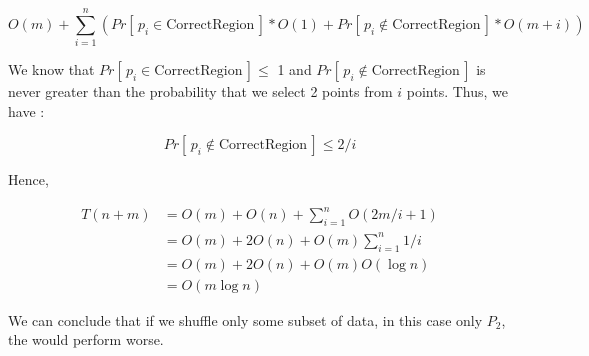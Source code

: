 $$
O(m) + \sum_{i=1}^{n}{ ( Pr[\,p_i \in \text{CorrectRegion}\,]*O(1) 
    + Pr[\,p_i \not\in \text{CorrectRegion}\,]*O(m+i)
) }
$$

We know that $Pr[\,p_i \in \text{CorrectRegion}\,] \le$ 1 and $Pr[\,p_i \not\in \text{CorrectRegion}\,]$
is never greater than the probability that we select 2 points from $i$ points. Thus,
we have :

$$
Pr[\,p_i \not\in \text{CorrectRegion}\,] \le 2/i
$$

Hence,

\begin{align*}
T(n+m) &= O(m) + O(n) + \sum_{i=1}^{n}O(2m/i+1) \\
&= O(m) + 2O(n) + O(m)\sum_{i=1}^{n}1/i \\
&= O(m) + 2O(n) + O(m)O(\log{n}) \\
&= O(m\log{n})
\end{align*}

We can conclude that if we shuffle only some subset of data, in this case only $P_2$, the
would perform worse.
